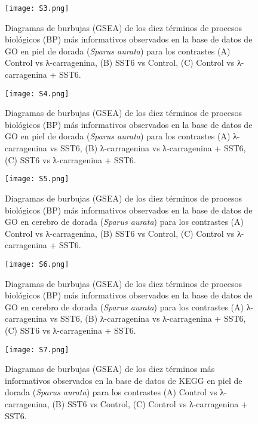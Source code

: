 \documentclass[10pt,a4paper]{article}
\begin{document}
\begin{figure}[ht]
  \centering
  \texttt{[image: S3.png]}%
  \caption[Diagramas GSEA]{%
	Diagramas de burbujas (GSEA) de los diez términos de procesos biológicos (BP) más informativos observados en la base de datos de GO en piel de dorada (\textit{Sparus aurata}) para los contrastes (A) Control vs λ-carragenina, (B) SST6 vs Control, (C) Control vs λ-carragenina + SST6.
 }
  \label{fig:S3}
\end{figure}


\begin{figure}[ht]
  \centering
  \texttt{[image: S4.png]}%
  \caption[Diagramas GSEA]{%
	Diagramas de burbujas (GSEA) de los diez términos de procesos biológicos (BP) más informativos observados en la base de datos de GO en piel de dorada (\textit{Sparus aurata}) para los contrastes (A) λ-carragenina vs SST6, (B) λ-carragenina vs λ-carragenina + SST6, (C) SST6 vs λ-carragenina + SST6.
 }
  \label{fig:S4}
\end{figure}


\begin{figure}[ht]
  \centering
  \texttt{[image: S5.png]}%
  \caption[Diagramas GSEA]{%
	Diagramas de burbujas (GSEA) de los diez términos de procesos biológicos (BP) más informativos observados en la base de datos de GO en cerebro de dorada (\textit{Sparus aurata}) para los contrastes (A) Control vs λ-carragenina, (B) SST6 vs Control, (C) Control vs λ-carragenina + SST6.
 }
  \label{fig:S5}
\end{figure}


\begin{figure}[ht]
  \centering
  \texttt{[image: S6.png]}%
  \caption[Diagramas GSEA]{%
	Diagramas de burbujas (GSEA) de los diez términos de procesos biológicos (BP) más informativos observados en la base de datos de GO en cerebro de dorada (\textit{Sparus aurata}) para los contrastes (A) λ-carragenina vs SST6, (B) λ-carragenina vs λ-carragenina + SST6, (C) SST6 vs λ-carragenina + SST6.
 }
  \label{fig:S6}
\end{figure}



\begin{figure}[ht]
  \centering
  \texttt{[image: S7.png]}%
  \caption[Diagramas GSEA]{%
	Diagramas de burbujas (GSEA) de los diez términos más informativos observados en la base de datos de KEGG en piel de dorada (\textit{Sparus aurata}) para los contrastes (A) Control vs λ-carragenina, (B) SST6 vs Control, (C) Control vs λ-carragenina + SST6.
 }
  \label{fig:S7}
\end{figure}
\end{document}
